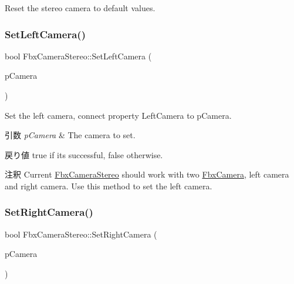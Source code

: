 Reset the stereo camera to default values. 

\mbox{\label{class_fbx_camera_stereo_a3f6d9d09dd4ec6f9fe1b1b829f26a11f}} 
\subsubsection{\texorpdfstring{Set\+Left\+Camera()}{SetLeftCamera()}}
{\footnotesize\ttfamily bool Fbx\+Camera\+Stereo\+::\+Set\+Left\+Camera (\begin{DoxyParamCaption}\item[{\hyperlink{class_fbx_camera}{Fbx\+Camera} $\ast$}]{p\+Camera }\end{DoxyParamCaption})}

Set the left camera, connect property Left\+Camera to p\+Camera. 
\begin{DoxyParams}{引数}
{\em p\+Camera} & The camera to set. \\
\hline
\end{DoxyParams}
\begin{DoxyReturn}{戻り値}
{\ttfamily true} if it\textquotesingle{}s successful, {\ttfamily false} otherwise. 
\end{DoxyReturn}
\begin{DoxyRemark}{注釈}
Current \hyperlink{class_fbx_camera_stereo}{Fbx\+Camera\+Stereo} should work with two \hyperlink{class_fbx_camera}{Fbx\+Camera}, left camera and right camera. Use this method to set the left camera. 
\end{DoxyRemark}
\mbox{\label{class_fbx_camera_stereo_a9b37a67b3bf1e94a6845077913083d78}} 
\subsubsection{\texorpdfstring{Set\+Right\+Camera()}{SetRightCamera()}}
{\footnotesize\ttfamily bool Fbx\+Camera\+Stereo\+::\+Set\+Right\+Camera (\begin{DoxyParamCaption}\item[{\hyperlink{class_fbx_camera}{Fbx\+Camera} $\ast$}]{p\+Camera }\end{DoxyParamCaption})}


